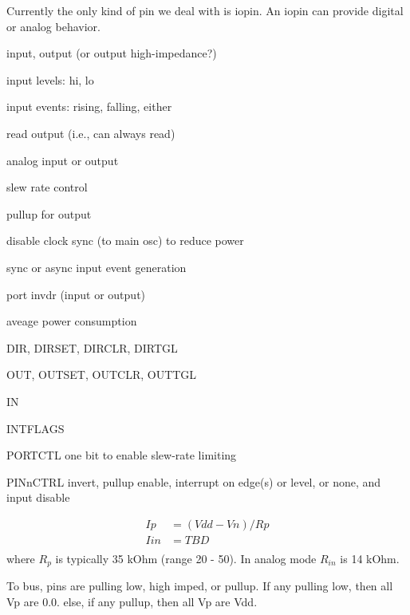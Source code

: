 \documentclass{article}
\begin{document}
Currently the only kind of pin we deal with is iopin.
An iopin can provide digital or analog behavior.

\begin{enumerated}
\item input, output (or output high-impedance?)
\item input levels: hi, lo
\item input events: rising, falling, either
\item read output (i.e., can always read)
\item analog input or output
\end{enumerated}

\begin{enumerated}
\item slew rate control
\item pullup for output
\item disable clock sync (to main osc) to reduce power
\item sync or async input event generation
\item port invdr (input or output)
\end{enumerated}

\begin{enumerated}
\item aveage power consumption
\end{enumerated}

\begin{enumerated}
\item DIR, DIRSET, DIRCLR, DIRTGL
\item OUT, OUTSET, OUTCLR, OUTTGL
\item IN
\item INTFLAGS
\item PORTCTL
  one bit to enable slew-rate limiting
\item PINnCTRL
  invert, pullup enable, interrupt on edge(s) or level, or none, and
  input disable
\end{enumerated}

\begin{align*}
  Ip & = (Vdd - Vn)/Rp \\
  Iin & = TBD \\
\end{align*}
where $R_p$ is typically 35 kOhm (range 20 - 50).
In analog mode $R_{in}$ is 14 kOhm.

\vskip 5pt

To bus, pins are pulling low, high imped, or pullup.
If any pulling low, then all Vp are 0.0.
else, if any pullup, then all Vp are Vdd.
\end{document}
